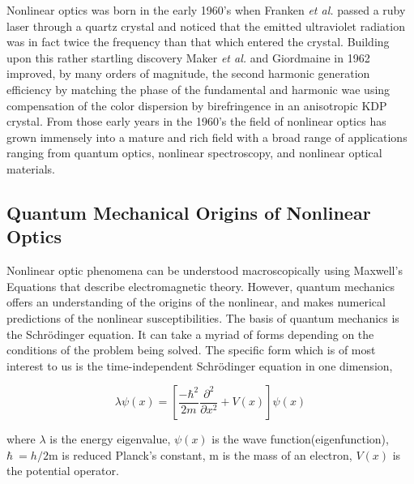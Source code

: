 \documentclass{report}
\theoremstyle{definition}
\begin{document}
Nonlinear optics was born in the early 1960's when Franken \textit{et al.} passed a ruby laser through a quartz crystal and noticed that the emitted ultraviolet radiation was in fact twice the frequency than that which entered the crystal. Building upon this rather startling discovery Maker \textit{et al.} and Giordmaine in 1962 improved, by many orders of magnitude,  the second harmonic generation efficiency by matching the phase of the fundamental and harmonic wae using compensation of the color dispersion by birefringence in an anisotropic KDP crystal. \cite{bloembergen} From those early years in the 1960's the field of nonlinear optics has grown immensely into a mature and rich field with a broad range of applications ranging from quantum optics, nonlinear spectroscopy, and nonlinear optical materials.%




\subsection*{Quantum Mechanical Origins of Nonlinear Optics}

Nonlinear optic phenomena can be understood macroscopically using Maxwell's Equations that describe electromagnetic theory. However, quantum mechanics offers an understanding of the origins of the nonlinear, and makes numerical predictions of the nonlinear susceptibilities. \cite{boyd2003} The basis of quantum mechanics is the Schr\"odinger equation. It can take a myriad of forms depending on the conditions of the problem being solved. The specific form which is of most interest to us is the time-independent Schr\"odinger equation in one dimension,

\begin{equation}
\lambda \psi(x) = \left[ \frac{-\hbar^2}{2m}\frac{\partial^2}{\partial x^2} + V(x) \right] \psi(x)
\end{equation}

\noindent where $\lambda$ is the energy eigenvalue, $\psi(x)$ is the wave function(eigenfunction), $\hbar\ = h/2\mathrm{m}$ is reduced Planck's constant, m is the mass of an electron, $V(x)$ is the potential operator. %
\end{document}
